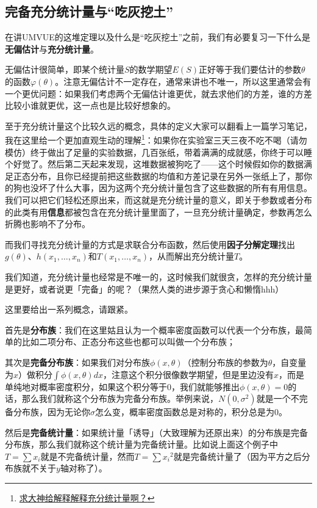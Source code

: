 \documentclass[10pt, a4paper]{article}
\begin{document}
\subsection{完备充分统计量与“吃灰挖土”}

在讲UMVUE的这堆定理以及什么是“吃灰挖土”之前，我们有必要复习一下什么是\textbf{无偏估计}与\textbf{充分统计量}。\par
无偏估计很简单，即某个统计量$S$的数学期望$E(S)$正好等于我们要估计的参数$\theta$的函数$\varphi(\theta)$。注意无偏估计不一定存在，通常来讲也不唯一，所以这里通常会有一个更优问题：如果我们考虑两个无偏估计谁更优，就去求他们的方差，谁的方差比较小谁就更优，这一点也是比较好想象的。\par
至于充分统计量这个比较久远的概念，具体的定义大家可以翻看上一篇学习笔记，我在这里给一个更加直观生动的理解\footnote{\href{https://www.zhihu.com/question/41367707/answer/572628701}{求大神给解释解释充分统计量啊？}}：如果你在实验室三天三夜不吃不喝（请勿模仿）终于做出了足量的实验数据，几百张纸，带着满满的成就感，你终于可以睡个好觉了。然后第二天起来发现，这堆数据被狗吃了——这个时候假如你的数据满足正态分布，且你已经提前把这些数据的均值和方差记录在另外一张纸上了，那你的狗也没坏了什么大事，因为这两个充分统计量包含了这些数据的所有有用信息。我们可以把它们轻松还原出来，而这就是充分统计量的意义，即关于参数或者分布的此类有用\textbf{信息}都被包含在充分统计量里面了，一旦充分统计量确定，参数再怎么折腾也影响不了分布。\par
而我们寻找充分统计量的方式是求联合分布函数，然后使用\textbf{因子分解定理}找出$g(\theta)$、$h(x_1,\dots,x_n)$和$T(x_1,\dots,x_n)$，从而解出充分统计量$T$。\par
我们知道，充分统计量也经常是不唯一的，这时候我们就很贪，怎样的充分统计量是更好，或者说更「完备」的呢？（果然人类的进步源于贪心和懒惰hhh）\par
这里要给出一系列概念，请跟紧。\par
首先是\textbf{分布族}：我们在这里姑且认为一个概率密度函数可以代表一个分布族，最简单的比如二项分布、正态分布这些也都可以叫做一个分布族；\par
其次是\textbf{完备分布族}：如果我们对分布族$\phi(x,\theta)$（控制分布族的参数为$\theta$，自变量为$x$）做积分$\int \phi(x, \theta) d x$，注意这个积分很像数学期望，但是里边没有$x$，而是单纯地对概率密度积分，如果这个积分等于0，我们就能够推出$\phi(x, \theta)=0$的话，那么我们就称这个分布族为完备分布族。举例来说，$N\left(0, \sigma^{2}\right)$就是一个不完备分布族，因为无论你$\sigma$怎么变，概率密度函数总是对称的，积分总是为0。\par
然后是\textbf{完备统计量}：如果统计量「诱导」（大致理解为还原出来）的分布族是完备分布族，那么我们就称这个统计量为完备统计量。比如说上面这个例子中$T=\sum x_i$就是不完备统计量，然而$T=\sum {x_i} ^2$就是完备统计量了（因为平方之后分布族就不关于$y$轴对称了）。\par
\end{document}
